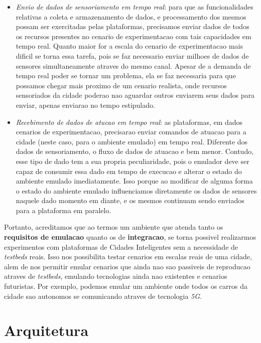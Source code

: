 \begin{itemize}
    \item \textit{Envio de dados de sensoriamento em tempo real}: para que as funcionalidades relativas a coleta e armazenamento de dados, e processamento dos mesmos possam ser
        exercitadas pelas plataformas, precisamos enviar dados de todos os recursos presentes no cenario de experimentacao com tais capacidades em tempo real.
        Quanto maior for a escala do cenario de experimentacao mais dificil se torna essa tarefa, pois se faz necessario enviar milhoes de dados de sensores simultaneamente atraves
        do mesmo canal.
        Apesar de a demanda de tempo real poder se tornar um problema, ela se faz necessaria para que possamos chegar mais proximo de um cenario realista, onde recursos sensoriados
        da cidade poderao nao aguardar outros enviarem seus dados para enviar, apenas enviarao no tempo estipulado.

    \item \textit{Recebimento de dados de atucao em tempo real}: as plataformas, em dados cenarios de experimentacao, precisarao enviar comandos de atuacao para a cidade (neste caso,
        para o ambiente emulado) em tempo real.
        Diferente dos dados de sensoriamento, o fluxo de dados de atuacao e bem menor.
        Contudo, esse tipo de dado tem a sua propria peculiaridade, pois o emulador deve ser capaz de consumir essa dado em tempo de execucao e alterar o estado do ambiente emulado
        imediatamente.
        Isso porque ao modificar de alguma forma o estado do ambiente emulado influenciamos diretamente os dados de sensores naquele dado momento em diante, e os mesmos continuam
        sendo enviados para a plataforma em paralelo.
\end{itemize}

Portanto, acreditamos que ao termos um ambiente que atenda tanto os \textbf{requisitos de emulacao} quanto os de \textbf{integracao}, se torna possivel realizarmos experimentos
com plataformas de Cidades Inteligentes sem a necessidade de \textit{testbeds} reais.
Isso nos possibilita testar cenarios em escalas reais de uma cidade, alem de nos permitir emular cenarios que ainda nao sao passiveis de reproducao atraves de \textit{testbeds},
emulando tecnologias ainda nao existentes e cenarios futuristas.
Por exemplo, podemos emular um ambiente onde todos os carros da cidade sao autonomos se comunicando atraves de tecnologia \textit{5G}.

\section{Arquitetura}

